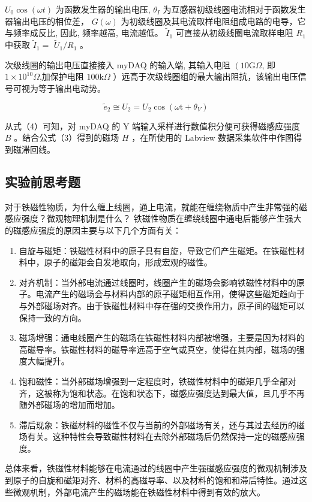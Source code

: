 \documentclass[dvipsnames, svgnames,a4paper,11pt]{article}
\begin{document}
$U_{0} \cos (\omega t)$ 为函数发生器的输出电压, $\theta_{I}$ 为互感器初级线圈电流相对于函数发生器输出电压的相位差， $G(\omega)$ 为初级线圈及其电流取样电阻组成电路的电导，它与频率成反比, 因此, 频率越高, 电流越低。 $\tilde{I}_{1}$ 可直接从初级线圈电流取样电阻 $R_{1}$ 中获取 $\tilde{I}_{1}=$ $\widetilde{U}_{1} / R_{1}$ 。

次级线圈的输出电压直接接入 myDAQ 的输入端, 其输入电阻 $\left(10 \mathrm{G} \Omega\right.$, 即 $1 \times 10^{10} \Omega$,加保护电阻 $100 \mathrm{k} \Omega$ ）远高于次级线圈组的最大输出阻抗，该输出电压信号可视为等于输出电动势。


\begin{equation*}
\tilde{e}_{2} \cong U_{2}=U_{2} \cos \left(\omega \mathrm{t}+\theta_{V}\right) \tag{6}
\end{equation*}


从式（4）可知，对 myDAQ 的 Y 端输入采样进行数值积分便可获得磁感应强度 $B$ 。结合公式（3）得到的磁场 $H$ ，在所使用的 Labview 数据采集软件中作图得到磁滞回线。

\subsection{实验前思考题}
\begin{question}
	对于铁磁性物质，为什么缠上线圈，通上电流，就能在缠绕物质中产生非常强的磁感应强度？微观物理机制是什么？
	\tcblower
	铁磁性物质在缠绕线圈中通电后能够产生强大的磁感应强度的原因主要与以下几个方面有关：
	\begin{enumerate}
		\item 自旋与磁矩：铁磁性材料中的原子具有自旋，导致它们产生磁矩。在铁磁性材料中，原子的磁矩会自发地取向，形成宏观的磁性。
		\item 对齐机制：当外部电流通过线圈时，线圈产生的磁场会影响铁磁性材料中的原子。电流产生的磁场会与材料内部的原子磁矩相互作用，使得这些磁矩趋向于与外部磁场对齐。由于铁磁性材料中存在强的交换作用力，原子间的磁矩可以保持一致的方向。
		\item 磁场增强：通电线圈产生的磁场在铁磁性材料内部被增强，主要是因为材料的高磁导率。铁磁性材料的磁导率远高于空气或真空，使得在其内部，磁场的强度大幅提升。
		\item 饱和磁性：当外部磁场增强到一定程度时，铁磁性材料中的磁矩几乎全部对齐，这被称为饱和状态。在饱和状态下，磁感应强度达到最大值，且几乎不再随外部磁场的增加而增加。
		\item 滞后现象：铁磁材料的磁性不仅与当前的外部磁场有关，还与其过去经历的磁场有关。这种特性会导致磁性材料在去除外部磁场后仍然保持一定的磁感应强度。
	\end{enumerate}
总体来看，铁磁性材料能够在电流通过的线圈中产生强磁感应强度的微观机制涉及到原子的自旋和磁矩对齐、材料的高磁导率、以及材料的饱和和滞后特性。通过这些微观机制，外部电流产生的磁场能在铁磁性材料中得到有效的放大。
\end{question}
\end{document}
